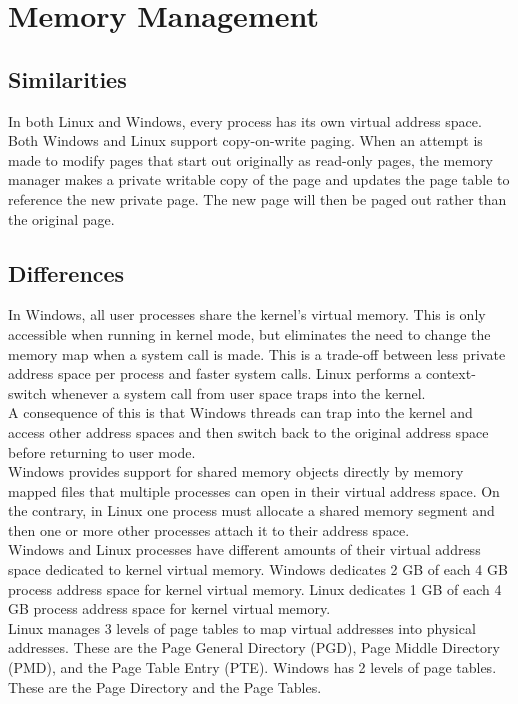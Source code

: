 \documentclass[letterpaper,10pt,titlepage]{article}
\begin{document}
\section{Memory Management}
\subsection{Similarities}
In both Linux and Windows, every process has its own virtual address space.
\\
\linebreak
Both Windows and Linux support copy-on-write paging. When an attempt is made
to modify pages that start out originally as read-only pages, the memory 
manager makes a private writable copy of the page and updates the page table 
to reference the new private page. The new page will then be paged out rather
than the original page.
\subsection{Differences}
In Windows, all user processes share the kernel's virtual memory. This is only 
accessible when running in kernel mode, but eliminates the need to change the
memory map when a system call is made. This is a trade-off between less private
address space per process and faster system calls. Linux performs a 
context-switch whenever a system call from user space traps into the kernel. 
\\
\linebreak
A consequence of this is that Windows threads can trap into the kernel and 
access other address spaces and then switch back to the original address space
before returning to user mode.
\\
\linebreak
Windows provides support for shared memory objects directly by memory 
mapped files that multiple processes can open in their virtual address space.
On the contrary, in Linux one process must allocate a shared memory segment and
then one or more other processes attach it to their address space.
\\
\linebreak
Windows and Linux processes have different amounts of their virtual address
space dedicated to kernel virtual memory. Windows dedicates 2 GB of each 4 GB
process address space for kernel virtual memory. Linux dedicates 1 GB of each
4 GB process address space for kernel virtual memory.
\\ 
\linebreak
Linux manages 3 levels of page tables to map virtual addresses into physical
addresses. These are the Page General Directory (PGD), Page Middle Directory
(PMD), and the Page Table Entry (PTE). Windows has 2 levels of page tables. 
These are the Page Directory and the Page Tables.
\end{document}
